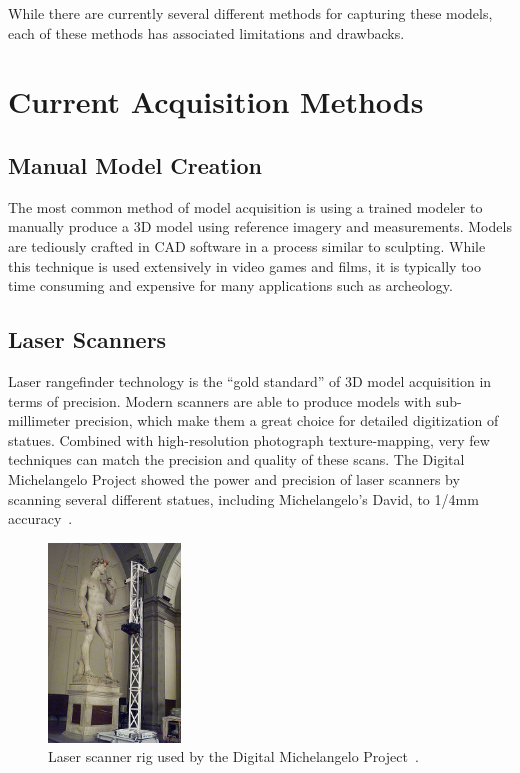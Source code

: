 While there are currently several different methods for capturing these models, each of these methods has associated limitations and drawbacks.


\section{Current Acquisition Methods}

\subsection{Manual Model Creation}
The most common method of model acquisition is using a trained modeler to manually produce a 3D model using reference imagery and measurements. Models are tediously crafted in CAD software in a process similar to sculpting. While this technique is used extensively in video games and films, it is typically too time consuming and expensive for many applications such as archeology.

\subsection{Laser Scanners}
Laser rangefinder technology is the ``gold standard'' of 3D model acquisition in terms of precision. Modern scanners are able to produce models with sub-millimeter precision, which make them a great choice for detailed digitization of statues. Combined with high-resolution photograph texture-mapping, very few techniques can match the precision and quality of these scans. The Digital Michelangelo Project showed the power and precision of laser scanners by scanning several different statues, including Michelangelo's David, to 1/4mm accuracy~\cite{Levoy}.

\begin{figure}
\centering
\includegraphics[height=200px]{../images/david_scan.jpg}
\caption{Laser scanner rig used by the Digital Michelangelo Project~\cite{Levoy}.}
\end{figure}

